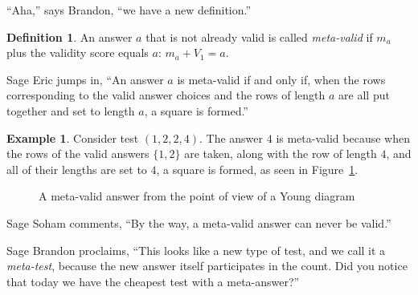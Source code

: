 \documentclass[12pt,reqno]{article}
\theoremstyle{plain}
\theoremstyle{definition}
\newtheorem{definition}{Definition}
\newtheorem{example}{Example}
\theoremstyle{remark}
\begin{document}
``Aha,'' says Brandon, ``we have a new definition.''

\begin{definition}
An answer $a$ that is not already valid is called \textit{meta-valid} if $m_a$ plus the validity score equals $a$: $m_a + V_1 = a$.
\end{definition}

Sage Eric jumps in, ``An answer $a$ is meta-valid if and only if, when the rows corresponding to the valid answer choices and the rows of length $a$ are all put together and set to length $a$, a square is formed.''

\begin{example}
    Consider test $(1, 2, 2, 4)$. The answer $4$ is meta-valid because when the rows of the valid answers $\{1, 2\}$ are taken, along with the row of length $4$, and all of their lengths are set to $4$, a square is formed, as seen in Figure~\ref{fig:metavalid}.

\begin{figure}[ht!]
    \centering
    \caption{A meta-valid answer from the point of view of a Young diagram}
    \label{fig:metavalid}
\end{figure}
\end{example}

Sage Soham comments, ``By the way, a meta-valid answer can never be valid.''

Sage Brandon proclaims, ``This looks like a new type of test, and we call it a \textit{meta-test}, because the new answer itself participates in the count. Did you notice that today we have the cheapest test with a meta-answer?''
\end{document}
